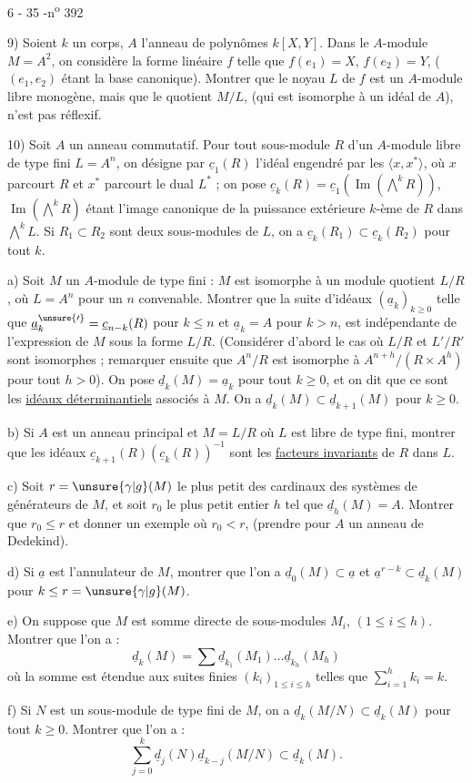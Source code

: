 \begin{center}6 - 35 -\hfill n\textsuperscript{o} 392\end{center}

9) Soient $k$ un corps, $A$ l'anneau de polynômes $k[X,Y]$. Dans le $A$-module $M=A^2$, on considère la forme linéaire $f$ telle que $f(e_1)=X$, $f(e_2)=Y$, ($(e_1,e_2)$ étant la base canonique). Montrer que le noyau $L$ de $f$ est un $A$-module libre monogène, mais que le quotient $M/L$, (qui est isomorphe à un idéal de $A$), n'est pas réflexif.

10) Soit $A$ un anneau commutatif. Pour tout sous-module $R$ d'un $A$-module libre de type fini $L=A^n$, on désigne par $\underline c_1(R)$ l'idéal engendré par les $\langle x,x^*\rangle$, où $x$ parcourt $R$ et $x^*$ parcourt le dual $L^*$ ; on pose $\underline c_k(R)=\underline c_1(\operatorname{Im}(\bigwedge^k R))$, $\operatorname{Im}(\bigwedge^k R)$ étant l'image canonique de la puissance extérieure $k$-ème de $R$ dans $\bigwedge^k L$. Si $R_1\subset R_2$ sont deux sous-modules de $L$, on a $\underline c_k(R_1)\subset\underline c_k(R_2)$ pour tout $k$.

a) Soit $M$ un $A$-module de type fini : $M$ est isomorphe à un module quotient $L/R$, où $L=A^n$ pour un $n$ convenable. Montrer que la suite d'idéaux $(\underline a_k)_{k\geq0}$ telle que $\underline a_k^{\unsure{\prime}}=\underline c_{n-k}(R)$ pour $k\leq n$ et $\underline a_k=A$ pour $k>n$, est indépendante de l'expression de $M$ sous la forme $L/R$. (Considérer d'abord le cas où $L/R$ et $L'/R'$ sont isomorphes ; remarquer ensuite que $A^n/R$ est isomorphe à $A^{n+h}/(R\times A^h)$ pour tout $h>0$). On pose $\underline d_k(M)=\underline a_k$ pour tout $k\geq0$, et on dit que ce sont les \uline{idéaux déterminantiels} associés à $M$. On a $\underline d_k(M)\subset\underline d_{k+1}(M)$ pour $k\geq0$.

b) Si $A$ est un anneau principal et $M=L/R$ où $L$ est libre de type fini, montrer que les idéaux $\underline c_{k+1}(R)(\underline c_k(R))^{-1}$ sont les \uline{facteurs invariants} de $R$ dans $L$.

c) Soit $r=\unsure{\gamma|g}(M)$ le plus petit des cardinaux des systèmes de générateurs de $M$, et soit $r_0$ le plus petit entier $h$ tel que $\underline d_h(M)=A$. Montrer que $r_0\leq r$ et donner un exemple où $r_0<r$, (prendre pour $A$ un anneau de Dedekind).

d) Si $\underline a$ est l'annulateur de $M$, montrer que l'on a $\underline d_0(M)\subset\underline a$ et $\underline a^{r-k}\subset\underline d_k(M)$ pour $k\leq r=\unsure{\gamma|g}(M)$.

e) On suppose que $M$ est somme directe de sous-modules $M_i$, $(1\leq i\leq h)$. Montrer que l'on a :
\[
\underline d_k(M)=\sum\underline d_{k_1}(M_1)\ldots\underline d_{k_h}(M_h)
\]
où la somme est étendue aux suites finies $(k_i)_{1\leq i\leq h}$ telles que $\sum_{i=1}^h k_i=k$.

f) Si $N$ est un sous-module de type fini de $M$, on a $\underline d_k(M/N)\subset\underline d_k(M)$ pour tout $k\geq0$. Montrer que l'on a :
\[
\sum_{j=0}^k\underline d_j(N)\underline d_{k-j}(M/N)\subset\underline d_k(M).
\]
